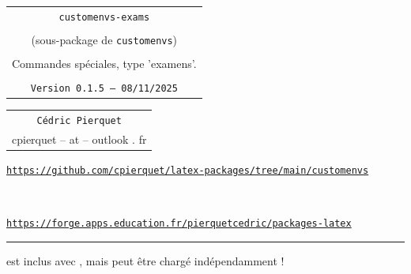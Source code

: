 \documentclass[french,11pt,a4paper]{article}
\def\TPversion{0.1.5}
\def\TPdate{08/11/2025}
\begin{document}
\pagestyle{fancy}

\thispagestyle{empty}

\begin{center}
	\begin{minipage}{0.88\linewidth}
	\begin{tcolorbox}[colframe=yellow,colback=yellow!15]
		\begin{center}
			\begin{tabular}{c}
				{\Huge \texttt{customenvs-exams}} \\
				\\
				{\LARGE (sous-package de \texttt{customenvs})}\\
				\\
				{\LARGE Commandes spéciales, type 'examens'.} \\
				\\
				{\small \texttt{Version \TPversion{} -- \TPdate}}
		\end{tabular}
		\end{center}
	\end{tcolorbox}
\end{minipage}
\end{center}

\begin{center}
	\begin{tabular}{c}
		\texttt{Cédric Pierquet}\\
		{\ttfamily cpierquet -- at -- outlook . fr}
	\end{tabular}
\end{center}

\begin{center}
	\begin{minipage}{0.85\linewidth}
		\begin{tcolorbox}[colframe=teal,colback=teal!10,halign=center,fontupper=\footnotesize]
			\texttt{\url{https://github.com/cpierquet/latex-packages/tree/main/customenvs}}
			
			~
			
			\texttt{\url{https://forge.apps.education.fr/pierquetcedric/packages-latex}}
		\end{tcolorbox}
	\end{minipage}
\end{center}

\vspace*{1.25cm}

\hrule

\medskip

\hfill{} est inclus avec , mais peut être chargé indépendamment !\hfill\null
\end{document}
